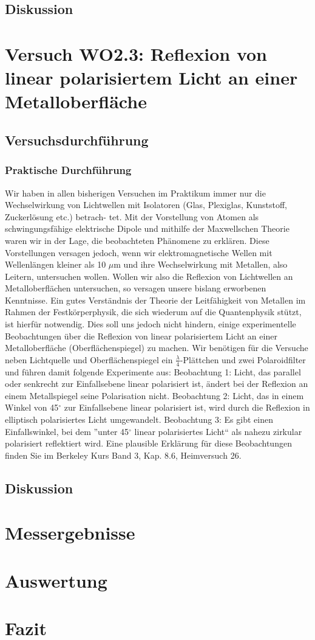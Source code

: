 \documentclass[12pt]{scrartcl}
\begin{document}
\subsection{Diskussion}

\section{Versuch WO2.3:
Reflexion von linear polarisiertem Licht an einer Metalloberfläche}
\subsection{Versuchsdurchführung}
\subsubsection{Praktische Durchführung}
Wir haben in allen bisherigen Versuchen im Praktikum immer nur die Wechselwirkung
von Lichtwellen mit Isolatoren (Glas, Plexiglas, Kunststoff, Zuckerlösung etc.) betrach-
tet. Mit der Vorstellung von Atomen als schwingungsfähige elektrische Dipole und mithilfe der Maxwellschen Theorie waren wir in der Lage, die beobachteten Phänomene zu erklären. Diese Vorstellungen versagen jedoch, wenn wir elektromagnetische Wellen mit Wellenlängen kleiner als 10 $\mu$m und ihre Wechselwirkung mit Metallen, also Leitern, untersuchen wollen. Wollen wir also die Reflexion von Lichtwellen an Metalloberflächen untersuchen, so versagen unsere bislang erworbenen Kenntnisse. Ein gutes Verständnis der Theorie der Leitfähigkeit von Metallen im Rahmen der Festkörperphysik, die sich wiederum auf die Quantenphysik stützt, ist hierfür notwendig. Dies soll uns jedoch nicht hindern, einige experimentelle Beobachtungen über die Reflexion von linear polarisiertem Licht an einer Metalloberfläche (Oberflächenspiegel) zu machen. Wir benötigen für die Versuche neben Lichtquelle und Oberflächenspiegel ein
$\frac{\lambda}{4}$-Plättchen und zwei Polaroidfilter und
führen damit folgende Experimente aus:
Beobachtung 1: Licht, das parallel oder senkrecht zur Einfallsebene linear polarisiert ist, ändert bei der Reflexion an einem Metallspiegel seine Polarisation nicht.
Beobachtung 2: Licht, das in einem Winkel von 45$^\circ$ zur Einfallsebene linear polarisiert ist, wird durch die Reflexion in elliptisch polarisiertes Licht umgewandelt.
Beobachtung 3: Es gibt einen Einfallswinkel, bei dem
”unter 45$^\circ$
linear polarisiertes
Licht“ als nahezu zirkular polarisiert reflektiert wird.
Eine plausible Erklärung für diese Beobachtungen finden Sie im Berkeley Kurs Band 3, Kap. 8.6, Heimversuch 26.
\subsection{Diskussion}


\section{Messergebnisse}


\section{Auswertung}


\section{Fazit}


\end{document}
